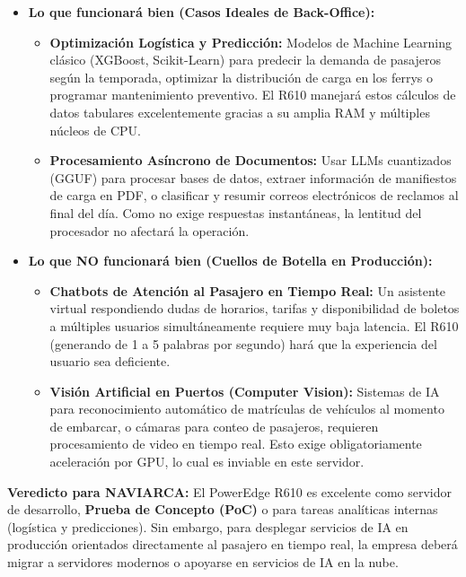 \documentclass[12pt,a4paper]{article}
\begin{document}
\begin{itemize}
    \item \textbf{Lo que funcionará bien (Casos Ideales de Back-Office):}
    \begin{itemize}
        \item \textbf{Optimización Logística y Predicción:} Modelos de Machine Learning clásico (XGBoost, Scikit-Learn) para predecir la demanda de pasajeros según la temporada, optimizar la distribución de carga en los ferrys o programar mantenimiento preventivo. El R610 manejará estos cálculos de datos tabulares excelentemente gracias a su amplia RAM y múltiples núcleos de CPU.
        \item \textbf{Procesamiento Asíncrono de Documentos:} Usar LLMs cuantizados (GGUF) para procesar bases de datos, extraer información de manifiestos de carga en PDF, o clasificar y resumir correos electrónicos de reclamos al final del día. Como no exige respuestas instantáneas, la lentitud del procesador no afectará la operación.
    \end{itemize}
    
    \item \textbf{Lo que NO funcionará bien (Cuellos de Botella en Producción):}
    \begin{itemize}
        \item \textbf{Chatbots de Atención al Pasajero en Tiempo Real:} Un asistente virtual respondiendo dudas de horarios, tarifas y disponibilidad de boletos a múltiples usuarios simultáneamente requiere muy baja latencia. El R610 (generando de 1 a 5 palabras por segundo) hará que la experiencia del usuario sea deficiente.
        \item \textbf{Visión Artificial en Puertos (Computer Vision):} Sistemas de IA para reconocimiento automático de matrículas de vehículos al momento de embarcar, o cámaras para conteo de pasajeros, requieren procesamiento de video en tiempo real. Esto exige obligatoriamente aceleración por GPU, lo cual es inviable en este servidor.
    \end{itemize}
\end{itemize}

\textbf{Veredicto para NAVIARCA:} El PowerEdge R610 es excelente como servidor de desarrollo, \textbf{Prueba de Concepto (PoC)} o para tareas analíticas internas (logística y predicciones). Sin embargo, para desplegar servicios de IA en producción orientados directamente al pasajero en tiempo real, la empresa deberá migrar a servidores modernos o apoyarse en servicios de IA en la nube.
\end{document}
